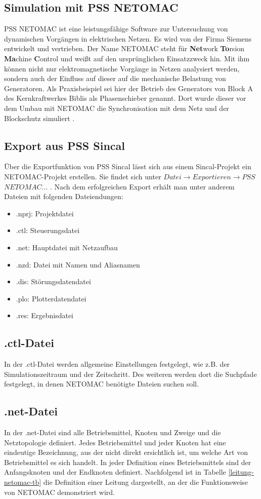 \documentclass{scrartcl}
\begin{document}
\begin{onehalfspace}
\section{Simulation mit PSS NETOMAC}
PSS NETOMAC ist eine leistungsfähige Software zur Untersuchung von dynamischen Vorgängen in elektrischen Netzen. Es wird von der Firma Siemens entwickelt und vertrieben. Der Name NETOMAC steht für \textbf{Net}work \textbf{To}rsion \textbf{Ma}chine \textbf{C}ontrol und weißt auf den ursprünglichen Einsatzzweck hin. Mit ihm können nicht nur elektromagnetische Vorgänge in Netzen analysiert werden, sondern auch der Einfluss auf dieser auf die mechanische Belastung von Generatoren. Als Praxisbeispiel sei hier der Betrieb des Generators von Block A des Kernkraftwerkes Biblis als Phasenschieber genannt. Dort wurde dieser vor dem Umbau mit NETOMAC die Synchronisation mit dem Netz und der Blockschutz simuliert \cite{phasenschieber-biblis}.

\subsection{Export aus PSS Sincal}
Über die Exportfunktion von PSS Sincal lässt sich aus einem Sincal-Projekt ein NETOMAC-Projekt erstellen. Sie findet sich unter $Datei \rightarrow Exportieren \rightarrow PSS$ $NETOMAC...$ .  Nach dem erfolgreichen Export erhält man unter anderem  Dateien mit folgenden Dateiendungen:

\begin{itemize}
\item .nprj: Projektdatei
\item .ctl: Steuerungsdatei
\item .net: Hauptdatei mit Netzaufbau
\item .nzd: Datei mit Namen und Aliasnamen
\item .dis: Störungsdatendatei
\item .plo: Plotterdatendatei
\item .res: Ergebnisdatei
\end{itemize}


\subsection{.ctl-Datei}
In der .ctl-Datei werden allgemeine Einstellungen festgelegt, wie z.B. der Simulationszeitraum und der Zeitschritt. Des weiteren werden dort die Suchpfade festgelegt, in denen NETOMAC benötigte Dateien suchen soll.

\subsection{.net-Datei}
In der .net-Datei sind alle Betriebsmittel, Knoten und Zweige und die Netztopologie definiert. Jedes Betriebsmittel und jeder Knoten hat eine eindeutige Bezeichnung, aus der nicht direkt ersichtlich ist, um welche Art von Betriebsmittel es sich handelt. In jeder Definition eines Betriebsmittels sind der Anfangsknoten und der Endknoten definiert. Nachfolgend ist in Tabelle \ref{leitung-netomac-tb} die Definition einer Leitung dargestellt, an der die Funktionsweise von NETOMAC demonstriert wird.


\end{onehalfspace}
\end{document}
